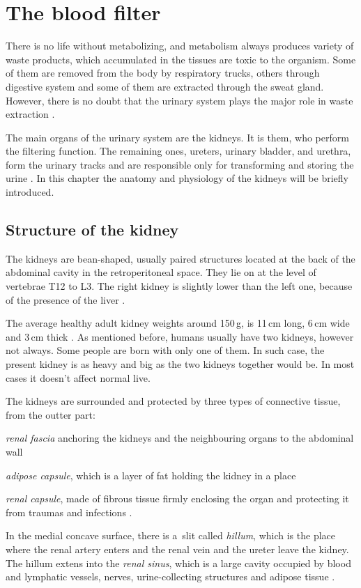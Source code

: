 \chapter{The blood filter}
	
There is no life without metabolizing, and metabolism always produces variety of waste products, which accumulated in the tissues are toxic to the organism. Some of them are removed from the body by respiratory trucks, others through digestive system and some of them are extracted through the sweat gland. However, there is no doubt that the urinary system plays the major role in waste extraction \cite{saladin, health_and_disease}.

The main organs of the urinary system are the kidneys. It is them, who perform the filtering function. The remaining ones,  ureters, urinary bladder, and urethra, form the urinary tracks and are responsible only for transforming and storing the urine \cite{saladin}. In this chapter the anatomy and physiology of the kidneys will be briefly introduced.

\section{Structure of the kidney} 

The kidneys are  bean-shaped, usually paired structures located at the back of the abdominal cavity in the retroperitoneal space. They lie on at the level of vertebrae T12 to L3.
The right kidney is slightly lower than the left one, because of the presence of the liver \cite{saladin, health_and_disease}. 

The average healthy adult kidney weights around 150\,g, is 11\,cm long, 6\,cm wide and 3\,cm thick \cite{kidney_dimensions, saladin}. As mentioned before, humans usually have two kidneys, however not always.  Some people are born with only one of them.  In such case, the present kidney is as heavy and big as the two kidneys together would be. In most cases it doesn't affect normal live. 

The kidneys are surrounded and protected by three types of connective tissue, from the outter part: 
\begin{inparaenum}[(1\upshape)]
\item \textit{renal fascia} anchoring the kidneys and the neighbouring organs to the abdominal wall
\item \textit{adipose capsule}, which is a layer of fat holding the kidney in a place
\item \textit{renal capsule}, made of fibrous tissue firmly enclosing the organ and protecting it from traumas and infections \cite{saladin, health_and_disease}.
\end{inparaenum} In the medial concave surface, there is a~slit called \textit{hillum}, which is the place where the  renal  artery enters and the renal vein and the ureter leave the kidney. The hillum extens into the \textit{renal sinus}, which is a large cavity occupied by blood and lymphatic vessels, nerves, urine-collecting structures and adipose tissue \cite{health_and_disease}.

